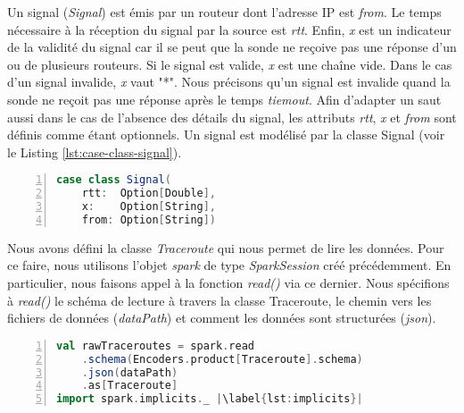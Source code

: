 Un signal (\textit{Signal}) est émis par  un routeur  dont l'adresse IP est \textit{from}. Le temps nécessaire à la réception du signal par la source est   \textit{rtt}. Enfin, \textit{x} est un indicateur de la validité du signal car il se peut que la sonde ne reçoive pas une réponse d'un ou de plusieurs routeurs. Si le signal est valide, \textit{x} est une chaîne vide. Dans le cas d'un signal invalide, \textit{x} vaut "*". Nous précisons qu'un signal est invalide quand la sonde ne reçoit pas une réponse après le temps \textit{tiemout}. Afin d'adapter un saut aussi dans le cas de l'absence des détails du signal, les attributs \textit{rtt}, \textit{x}  et \textit{from} sont définis comme étant optionnels.  
Un signal est modélisé par la classe Signal (voir le Listing \ref{lst:case-class-signal}). 

\begin{lstlisting}[language=scala,firstnumber=1, caption={Définition de la  classe Signal}, label={lst:case-class-signal}, basicstyle = \footnotesize,escapechar=|,numbers=left,
stepnumber=1]
case class Signal(
	rtt:  Option[Double],
	x:    Option[String],
	from: Option[String])
\end{lstlisting}

Nous avons défini  la classe \textit{Traceroute} qui nous permet de lire les données. Pour ce faire, nous utilisons l'objet \textit{spark} de type \textit{SparkSession} créé précédemment. En particulier, nous faisons appel à   la fonction \textit{read()} via ce dernier. Nous spécifions à \textit{read()} le schéma de lecture à travers la classe Traceroute, le chemin vers les fichiers de données (\textit{dataPath}) et comment  les données  sont structurées (\textit{json}). 

\begin{lstlisting}[language=scala,firstnumber=1, caption={La lecture des données traceroutes},label={lst:mapping}, basicstyle = \footnotesize,escapechar=|,numbers=left,
stepnumber=1]
val rawTraceroutes = spark.read
	.schema(Encoders.product[Traceroute].schema)
	.json(dataPath)
	.as[Traceroute]
import spark.implicits._ |\label{lst:implicits}|
 \end{lstlisting}

